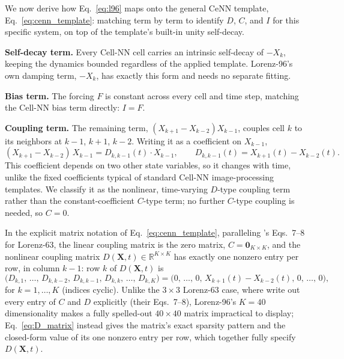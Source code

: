 \documentclass[final,5p,times,twocolumn,authoryear]{elsarticle}
\begin{document}
We now derive how Eq.~\eqref{eq:l96} maps onto the general CeNN
template, Eq.~\eqref{eq:cenn_template}: matching term by term to
identify $D$, $C$, and $I$ for this specific system, on top of the
template's built-in unity self-decay.

\textbf{Self-decay term.} Every Cell-NN cell carries an intrinsic
self-decay of $-X_k$, keeping the dynamics bounded regardless of the
applied template. Lorenz-96's own damping term, $-X_k$, has exactly
this form and needs no separate fitting.

\textbf{Bias term.} The forcing $F$ is constant across every cell
and time step, matching the Cell-NN bias term directly: $I=F$.

\textbf{Coupling term.} The remaining term,
$(X_{k+1}-X_{k-2})X_{k-1}$, couples cell $k$ to its neighbors at
$k-1$, $k+1$, $k-2$. Writing it as a coefficient on $X_{k-1}$,
\begin{equation}
(X_{k+1}-X_{k-2})\,X_{k-1} = D_{k,k-1}(t)\cdot X_{k-1}, \qquad
D_{k,k-1}(t) = X_{k+1}(t) - X_{k-2}(t).
\end{equation}
This coefficient depends on two other state variables, so it changes
with time, unlike the fixed coefficients typical of standard Cell-NN
image-processing templates. We classify it as the nonlinear,
time-varying $D$-type coupling term rather than the constant-coefficient
$C$-type term; no further $C$-type coupling is needed, so $C=0$.

In the explicit matrix notation of Eq.~\eqref{eq:cenn_template},
paralleling \citet{magno2025}'s Eqs.~7--8 for Lorenz-63, the linear
coupling matrix is the zero matrix, $C = \mathbf{0}_{K\times K}$, and
the nonlinear coupling matrix $D(\mathbf{X},t) \in \mathbb{R}^{K
\times K}$ has exactly one nonzero entry per row, in column $k-1$:
row $k$ of $D(\mathbf{X},t)$ is
\begin{equation}
\bigl(D_{k,1},\, \ldots,\, D_{k,k-2},\, D_{k,k-1},\, D_{k,k},\,
\ldots,\, D_{k,K}\bigr) = \bigl(0,\, \ldots,\, 0,\, X_{k+1}(t) -
X_{k-2}(t),\, 0,\, \ldots,\, 0\bigr),
\label{eq:D_matrix}
\end{equation}
for $k=1,\dots,K$ (indices cyclic). Unlike the $3\times3$ Lorenz-63
case, where \citet{magno2025} write out every entry of $C$ and $D$
explicitly (their Eqs.~7--8), Lorenz-96's $K=40$ dimensionality makes
a fully spelled-out $40\times40$ matrix impractical to display;
Eq.~\eqref{eq:D_matrix} instead gives the matrix's exact sparsity
pattern and the closed-form value of its one nonzero entry per row,
which together fully specify $D(\mathbf{X},t)$.
\end{document}
